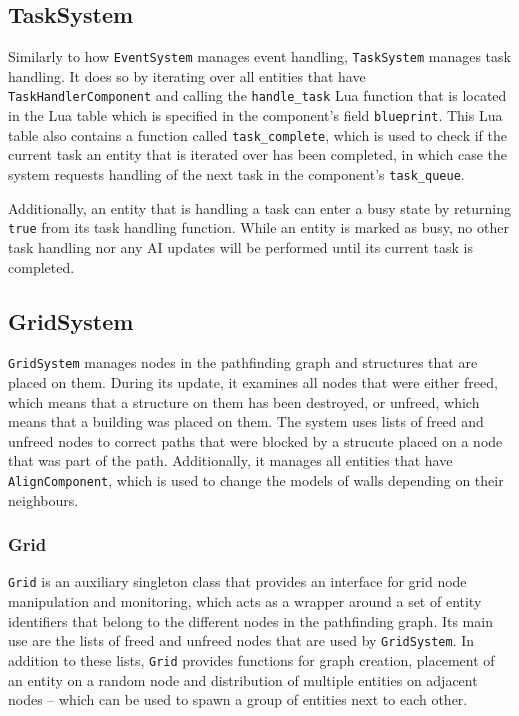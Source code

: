 \subsection{TaskSystem}

Similarly to how \texttt{EventSystem} manages event handling, \texttt{TaskSystem} manages task handling. It does so by iterating over
all entities that have \texttt{TaskHandlerComponent} and calling the \texttt{handle\_task} Lua function that is located in the Lua
table which is specified in the component's field \texttt{blueprint}. This Lua table also contains a function called \texttt{task\_complete},
which is used to check if the current task an entity that is iterated over has been completed, in which case the system requests
handling of the next task in the component's \texttt{task\_queue}.

Additionally, an entity that is handling a task can enter a busy state by returning \texttt{true} from its task handling function.
While an entity is marked as busy, no other task handling nor any AI updates will be performed until its current task is completed.

\subsection{GridSystem}

\texttt{GridSystem} manages nodes in the pathfinding graph and structures that are placed on them. During its update, it examines all
nodes that were either freed, which means that a structure on them has been destroyed, or unfreed, which means that a building was
placed on them. The system uses lists of freed and unfreed nodes to correct paths that were blocked by a strucute placed on a node
that was part of the path. Additionally, it manages all entities that have \texttt{AlignComponent}, which is used to change the models
of walls depending on their neighbours.

\subsubsection{Grid}

\texttt{Grid} is an auxiliary singleton class that provides an interface for grid node manipulation and monitoring, which acts as a
wrapper around a set of entity identifiers that belong to the different nodes in the pathfinding graph. Its main use are the lists
of freed and unfreed nodes that are used by \texttt{GridSystem}. In addition to these lists, \texttt{Grid} provides functions for graph
creation, placement of an entity on a random node and distribution of multiple entities on adjacent nodes -- which can be used to spawn
a group of entities next to each other.

